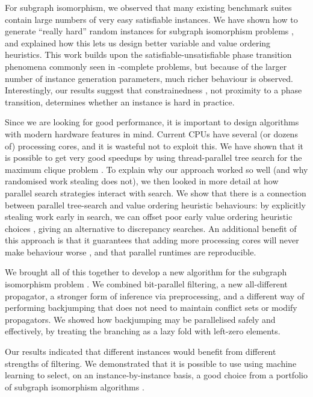 \documentclass[letterpaper]{article}
\begin{document}
For subgraph isomorphism, we observed that many existing benchmark suites contain large numbers of
very easy satisfiable instances. We have shown how to generate ``really hard'' random instances for
subgraph isomorphism problems \cite{ijcai/McCreeshPT15}, and explained how this lets us design
better variable and value ordering heuristics. This work builds upon the satisfiable-unsatisfiable
phase transition phenomena commonly seen in \NP-complete problems, but because of the larger number
of instance generation parameters, much richer behaviour is observed.  Interestingly, our results
suggest that constrainedness \cite{Gent:1996:Kappa}, not proximity to a phase transition, determines
whether an instance is hard in practice.

Since we are looking for good performance, it is important to design algorithms with modern hardware
features in mind. Current CPUs have several (or dozens of) processing cores, and it is wasteful not
to exploit this. We have shown that it is possible to get very good speedups by using
thread-parallel tree search for the maximum clique problem \cite{algorithms/McCreeshP13}. To explain
why our approach worked so well (and why randomised work stealing does not), we then looked in more
detail at how parallel search strategies interact with search.  We show that there is a connection
between parallel tree-search and value ordering heuristic behaviours: by explicitly stealing work
early in search, we can offset poor early value ordering heuristic choices \cite{topc/McCreeshP15},
giving an alternative to discrepancy searches. An additional benefit of this approach is
that it guarantees that adding more processing cores will never make behaviour worse
\cite{Trienekens:1990}, and that parallel runtimes are reproducible.

We brought all of this together to develop a new algorithm for the subgraph isomorphism problem
\cite{cp/McCreeshP15}. We combined bit-parallel filtering, a new all-different propagator,
a stronger form of inference via preprocessing, and a different way of performing backjumping that
does not need to maintain conflict sets or modify propagators. We showed how backjumping may be
parallelised safely and effectively, by treating the branching as a lazy fold with left-zero
elements.

Our results indicated that different instances would benefit from different strengths of filtering. We
demonstrated that it is possible to use using machine learning to select, on an instance-by-instance
basis, a good choice from a portfolio of subgraph isomorphism algorithms \cite{lion/KotthoffMS15}.
\end{document}
